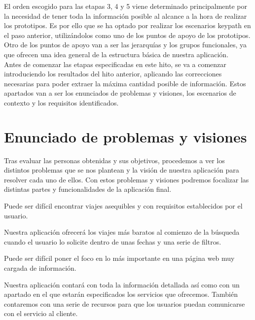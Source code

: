 El orden escogido para las etapas 3, 4 y 5 viene determinado principalmente por la necesidad de tener toda la información posible al alcance a la hora de realizar los
prototipos. Es por ello que se ha optado por realizar los escenarios keypath en el paso anterior, utilizándolos como uno de los puntos de apoyo de los prototipos. Otro
de los puntos de apoyo van a ser las jerarquías y los grupos funcionales, ya que ofrecen una idea general de la estructura básica de nuestra aplicación. \\

Antes de comenzar las etapas especificadas en este hito, se va a comenzar introduciendo los resultados del hito anterior, aplicando las correcciones necesarias para poder
extraer la máxima cantidad posible de información. Estos apartados van a ser los enunciados de problemas y visiones, los escenarios de contexto y los requisitos identificados.

\section{Enunciado de problemas y visiones}
Tras evaluar las personas obtenidas y sus objetivos, procedemos a ver los distintos problemas que se nos plantean y la visión de nuestra aplicación para resolver cada uno de ellos. Con estos problemas y visiones podremos focalizar las distintas partes y funcionalidades de la aplicación final.

\begin{problema}

      Puede ser difícil encontrar viajes asequibles y con requisitos establecidos por
      el usuario.

            {\centering
                  \begin{vision} \justifying\noindent
                        Nuestra aplicación ofrecerá los viajes más baratos al comienzo de la búsqueda cuando el usuario lo solicite dentro de unas fechas y una serie de filtros.

                  \end{vision}}
\end{problema}

\vspace{0.5cm}

\begin{problema}
      Puede ser difícil poner el foco en lo más importante en una página web muy cargada de información.

      {\centering
      \begin{vision}\justifying\noindent
            Nuestra aplicación contará con toda la información detallada así como con un apartado en el que estarán especificados los servicios que ofrecemos. También contaremos con una serie de recursos para que los usuarios puedan comunicarse con el servicio al cliente.
      \end{vision}}
\end{problema}

